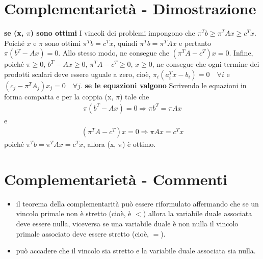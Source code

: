 \documentclass[a4paper, 11pt]{article}
\begin{document}
        \section*{Complementarietà - Dimostrazione}
        \textbf{se (x, $\pi$) sono ottimi} I vincoli dei problemi impongono che $\pi^T b \geq \pi^T A x \geq c^T x$.
        Poiché $x$ e $\pi$ sono ottimi $\pi^T b = c^T x$, quindi $\pi^T b = \pi^T A x$ e pertanto
        $\pi(b^T - Ax) = 0$. Allo stesso modo, ne consegue che $(\pi^T A - c^T)x = 0$. Infine, poiché $\pi \geq 0$,
        $b^T - Ax \geq 0$, $\pi^T A - c^T \geq 0$, $x \geq 0$, ne consegue che ogni termine dei prodotti scalari deve essere uguale a zero, cioè, $\pi_i(a^T_i x - b_i) = 0 \quad \forall i$ e
        $(c_j - \pi^T A_j)x_j = 0 \quad \forall j$.
        \newline
        \textbf{se le equazioni valgono} Scrivendo le equazioni in forma compatta e per la coppia
        (x, $\pi$) tale che
        \begin{align*}
            \pi(b^T - Ax) = 0 \Rightarrow \pi b^T = \pi Ax
        \end{align*}
        e
        \begin{align*}
            (\pi^T A - c^T)x = 0 \Rightarrow \pi Ax = c^T x
        \end{align*}
        poiché $\pi^T b = \pi^T Ax = c^T x$, allora (x, $\pi$) è ottimo.
        
        \section*{Complementarietà - Commenti}
        \begin{itemize}
            \item il teorema della complementarità può essere riformulato affermando che se un vincolo primale non è stretto (cioè, è $<$) allora la variabile duale associata deve essere nulla, viceversa se una variabile duale è non nulla il vincolo primale associato deve essere stretto (cioè, $=$).
            \item può accadere che il vincolo sia stretto e la variabile duale associata sia nulla.
        \end{itemize}
        
\end{document}
